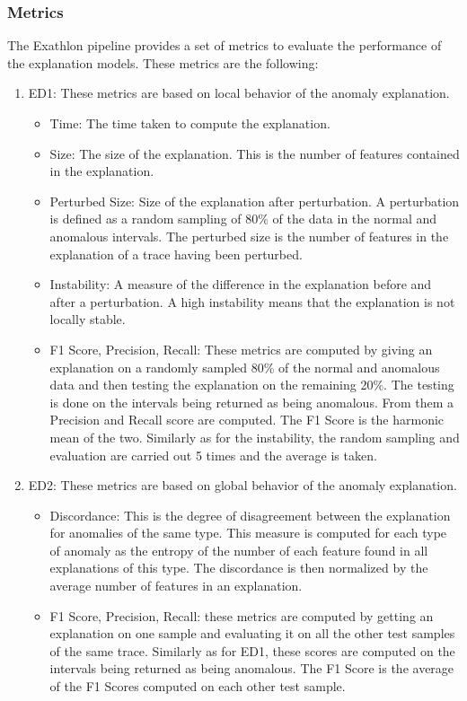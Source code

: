 \documentclass[oneside, a4paper, onecolumn, 11pt]{article}
\begin{document}
\subsubsection{Metrics}
The Exathlon pipeline provides a set of metrics to evaluate the performance of the explanation models. These metrics are the following:
\begin{enumerate}
  \item ED1: These metrics are based on local behavior of the anomaly explanation.
  \begin{itemize}
    \item Time: The time taken to compute the explanation.
    \item Size: The size of the explanation. This is the number of features contained in the explanation.
    \item Perturbed Size: Size of the explanation after perturbation. A perturbation is defined as a random sampling of 80\% of the data in the normal and anomalous intervals. The perturbed size is the number of features in the explanation of a trace having been perturbed.
    \item Instability: A measure of the difference in the explanation before and after a perturbation. A high instability means that the explanation is not locally stable.
    \item F1 Score, Precision, Recall: These metrics are computed by giving an explanation on a randomly sampled 80\% of the normal and anomalous data and then testing the explanation on the remaining 20\%. The testing is done on the intervals being returned as being anomalous. From them a Precision and Recall score are computed. The F1 Score is the harmonic mean of the two. Similarly as for the instability, the random sampling and evaluation are carried out 5 times and the average is taken.
  \end{itemize}
  \item ED2: These metrics are based on global behavior of the anomaly explanation.
  \begin{itemize}
    \item Discordance: This is the degree of disagreement between the explanation for anomalies of the same type. This measure is computed for each type of anomaly as the entropy of the number of each feature found in all explanations of this type. The discordance is then normalized by the average number of features in an explanation.
    \item F1 Score, Precision, Recall: these metrics are computed by getting an explanation on one sample and evaluating it on all the other test samples of the same trace. Similarly as for ED1, these scores are computed on the intervals being returned as being anomalous. The F1 Score is the average of the F1 Scores computed on each other test sample.
  \end{itemize}
\end{enumerate}
\end{document}
